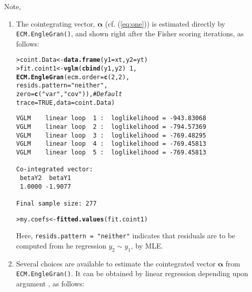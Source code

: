 \documentclass[a4paper, 11pt]{article}\usepackage[]{graphicx}\usepackage[]{color}
\makeatletter
\newcommand{\hlnum}[1]{\textcolor[rgb]{0.686,0.059,0.569}{#1}}%
\newcommand{\hlstr}[1]{\textcolor[rgb]{0.192,0.494,0.8}{#1}}%
\newcommand{\hlcom}[1]{\textcolor[rgb]{0.678,0.584,0.686}{\textit{#1}}}%
\newcommand{\hlopt}[1]{\textcolor[rgb]{0,0,0}{#1}}%
\newcommand{\hlstd}[1]{\textcolor[rgb]{0.345,0.345,0.345}{#1}}%
\newcommand{\hlkwb}[1]{\textcolor[rgb]{0.69,0.353,0.396}{#1}}%
\newcommand{\hlkwc}[1]{\textcolor[rgb]{0.333,0.667,0.333}{#1}}%
\newcommand{\hlkwd}[1]{\textcolor[rgb]{0.737,0.353,0.396}{\textbf{#1}}}%
\newenvironment{kframe}{%
 \def\at@end@of@kframe{}%
 \ifinner\ifhmode%
  \def\at@end@of@kframe{\end{minipage}}%
  \begin{minipage}{\columnwidth}%
 \fi\fi%
 \def\FrameCommand##1{\hskip\@totalleftmargin \hskip-\fboxsep
 \colorbox{shadecolor}{##1}\hskip-\fboxsep
     \hskip-\linewidth \hskip-\@totalleftmargin \hskip\columnwidth}%
 \MakeFramed {\advance\hsize-\width
   \@totalleftmargin\z@ \linewidth\hsize
   \@setminipage}}%
 {\par\unskip\endMakeFramed%
 \at@end@of@kframe}
\newenvironment{knitrout}{}{} %
\makeatother
\begin{document}
\newpage
Note, 
\begin{enumerate}
\item The cointegrating vector,
$\mathbold{\alpha}$ (cf. (\ref{eq:one}))
is estimated directly by 
{\color{blue} \texttt{ECM.EngleGran()}}, and shown right after
the Fisher scoring iterations, as follows:

\begin{knitrout}\scriptsize
{}\color{fgcolor}\begin{kframe}
\begin{alltt}
\hlstd{> }\hlstd{coint.Data} \hlkwb{<-} \hlkwd{data.frame}\hlstd{(}\hlkwc{y1} \hlstd{= xt,} \hlkwc{y2} \hlstd{= yt)}
\hlstd{> }\hlstd{fit.coint1} \hlkwb{<-} \hlkwd{vglm}\hlstd{(}\hlkwd{cbind}\hlstd{(y1, y2)} \hlopt{~} \hlnum{1}\hlstd{,}
\hlstd{  }                   \hlkwd{ECM.EngleGran}\hlstd{(}\hlkwc{ecm.order} \hlstd{=} \hlkwd{c}\hlstd{(}\hlnum{2}\hlstd{,} \hlnum{2}\hlstd{),}
\hlstd{  }                                 \hlkwc{resids.pattern} \hlstd{=} \hlstr{"neither"}\hlstd{,}
\hlstd{  }                                 \hlkwc{zero} \hlstd{=} \hlkwd{c}\hlstd{(}\hlstr{"var"}\hlstd{,} \hlstr{"cov"}\hlstd{)),} \hlcom{# Default}
\hlstd{  }                   \hlkwc{trace} \hlstd{=} \hlnum{TRUE}\hlstd{,} \hlkwc{data} \hlstd{= coint.Data)}
\end{alltt}
\begin{verbatim}
VGLM    linear loop  1 :  loglikelihood = -943.83068
VGLM    linear loop  2 :  loglikelihood = -794.57369
VGLM    linear loop  3 :  loglikelihood = -769.48295
VGLM    linear loop  4 :  loglikelihood = -769.45813
VGLM    linear loop  5 :  loglikelihood = -769.45813

Co-integrated vector:
 betaY2  betaY1 
 1.0000 -1.9077 
                      
Final sample size: 277
\end{verbatim}
\begin{alltt}
\hlstd{> }\hlstd{my.coefs} \hlkwb{<-} \hlkwd{fitted.values}\hlstd{(fit.coint1)}
\end{alltt}
\end{kframe}
\end{knitrout}

Here, {\color{blue} \texttt{resids.pattern = "neither"}} indicates that
residuals are to be computed from he regression $y_2 \sim y_1$, by MLE.


\item Several choices are available to estimate the
cointegrated vector $\boldsymbol{\alpha}$ from
{\color{blue} \texttt{ECM.EngleGran()}}.
It can be obtained by linear regression
depending upon argument {\color{blue}},
as follows:


\end{enumerate}
\end{document}
